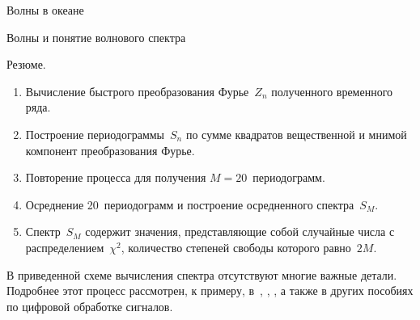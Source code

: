 \begin{chapter}{Волны в океане}
\begin{section}{Волны и понятие волнового спектра}
\begin{paragraph}{Резюме.}
\begin{enumerate}
\item
Вычисление быстрого преобразования Фурье~$Z_{n}$ полученного временного ряда.
%

\item
Построение периодограммы~$S_{n}$ по сумме квадратов вещественной и мнимой
компонент преобразования Фурье.
%

\item
Повторение процесса для получения $M=20$~периодограмм.
%

\item
Осреднение 20~периодограмм и построение осредненного спектра~$S_{M}$.
%

\item
Спектр~$S_{M}$ содержит значения, представляющие собой случайные числа с
распределением~$\chi ^{2}$, количество степеней свободы которого равно~$2 M$.
%
\end{enumerate}
В приведенной схеме вычисления спектра отсутствуют многие важные детали.
Подробнее этот процесс рассмотрен, к примеру, в~\cite{Percival:1993}, 
\cite[\S~12]{Press:1992}, \cite{Oppenheim:1975}, а также
в других пособиях по цифровой обработке сигналов.
%
\end{paragraph}
\end{section}


\end{chapter}
